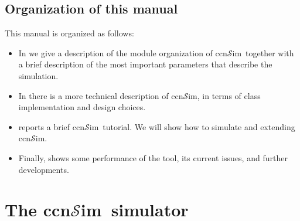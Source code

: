 \documentclass{article}
\newcommand{\ccnsim}{ccn$\mathcal{S}$im}
\begin{document}
\subsection{Organization of this manual}
This manual is organized as follows:
\begin{itemize}
    \item  In  we give a description of the module organization of \ccnsim\ together with a brief description of the most important parameters that describe the simulation.
    \item In   there is a more technical description of \ccnsim, in terms of class implementation and design choices. 
    \item {} reports a brief \ccnsim\ tutorial. We will show how to simulate and extending \ccnsim. 
    \item Finally,  shows some performance of the tool, its current issues, and further developments.
\end{itemize}


\section{The \ccnsim\ simulator}\label{sec:detalils}
\end{document}
